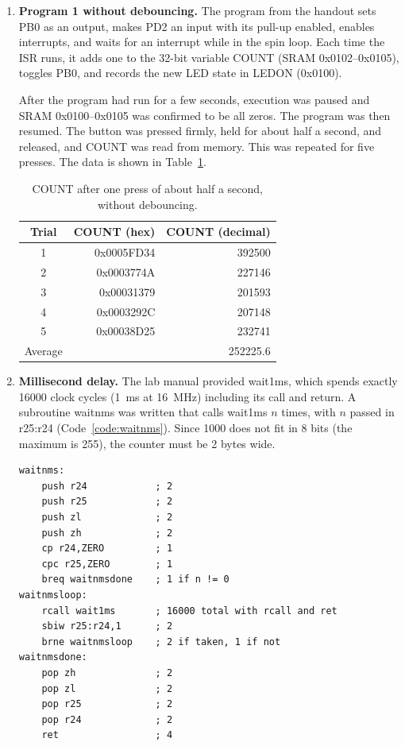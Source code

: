\documentclass[11pt]{article}
\begin{document}
\begin{enumerate}
\item \textbf{Program 1 without debouncing.} The program from the handout sets PB0 as an output, makes PD2 an input with its pull-up enabled, enables interrupts, and waits for an interrupt while in the spin loop. Each time the ISR runs, it adds one to the 32-bit variable COUNT (SRAM 0x0102--0x0105), toggles PB0, and records the new LED state in LEDON (0x0100).

After the program had run for a few seconds, execution was paused and SRAM 0x0100--0x0105 was confirmed to be all zeros. The program was then resumed. The button was pressed firmly, held for about half a second, and released, and COUNT was read from memory. This was repeated for five presses. The data is shown in Table~\ref{tab:count}.

\begin{table}[H]
  \centering
  \caption{COUNT after one press of about half a second, without debouncing.}
  \label{tab:count}
  \begin{tabular}{crr}
    \toprule
    Trial & COUNT (hex) & COUNT (decimal) \\
    \midrule
    1 & 0x0005FD34 & 392500 \\
    2 & 0x0003774A & 227146 \\
    3 & 0x00031379 & 201593 \\
    4 & 0x0003292C & 207148 \\
    5 & 0x00038D25 & 232741 \\
    \midrule
    Average & & 252225.6 \\
    \bottomrule
  \end{tabular}
\end{table}

\item \textbf{Millisecond delay.} The lab manual provided wait1ms, which spends exactly 16000 clock cycles (1~ms at 16~MHz) including its call and return. A subroutine waitnms was written that calls wait1ms $n$ times, with $n$ passed in r25:r24 (Code~\ref{code:waitnms}). Since 1000 does not fit in 8 bits (the maximum is 255), the counter must be 2 bytes wide.

\begin{lstlisting}[language=avrasm,caption={The $n$-millisecond delay used for debouncing.},label={code:waitnms}]
waitnms:
    push r24            ; 2
    push r25            ; 2
    push zl             ; 2
    push zh             ; 2
    cp r24,ZERO         ; 1
    cpc r25,ZERO        ; 1
    breq waitnmsdone    ; 1 if n != 0
waitnmsloop:
    rcall wait1ms       ; 16000 total with rcall and ret
    sbiw r25:r24,1      ; 2
    brne waitnmsloop    ; 2 if taken, 1 if not
waitnmsdone:
    pop zh              ; 2
    pop zl              ; 2
    pop r25             ; 2
    pop r24             ; 2
    ret                 ; 4
\end{lstlisting}


\end{enumerate}
\end{document}
